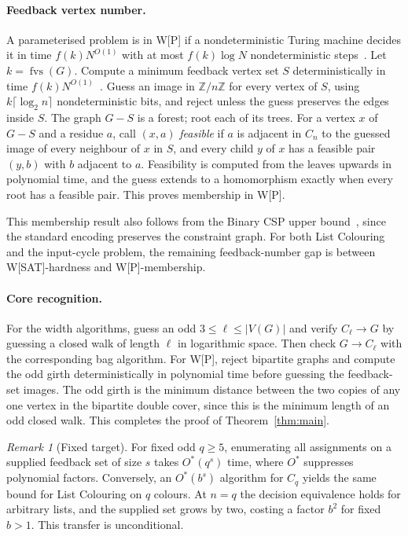 \documentclass[11pt]{article}
\theoremstyle{remark}
\newtheorem{remark}[theorem]{Remark}
\DeclareMathOperator{\fvs}{fvs}
\newcommand{\Z}{\mathbb{Z}}
\begin{document}
\paragraph{Feedback vertex number.}
A parameterised problem is in W[P] if a nondeterministic Turing machine
decides it in time $f(k)N^{O(1)}$ with at most $f(k)\log N$ nondeterministic
steps~\cite[Chapter~3]{flumgrohe2006}. Let $k=\fvs(G)$. Compute a minimum
feedback vertex set $S$ deterministically in time
$f(k)N^{O(1)}$~\cite{cygan2015}. Guess an image in $\Z/n\Z$ for every vertex
of $S$, using $k\lceil\log_2 n\rceil$ nondeterministic bits, and reject
unless the guess preserves the edges inside $S$. The graph $G-S$ is a
forest; root each of its trees. For a vertex $x$ of $G-S$ and a residue
$a$, call $(x,a)$ \emph{feasible} if $a$ is adjacent in $C_n$ to the guessed
image of every neighbour of $x$ in $S$, and every child $y$ of $x$ has a
feasible pair $(y,b)$ with $b$ adjacent to $a$. Feasibility is computed from
the leaves upwards in polynomial time, and the guess extends to a
homomorphism exactly when every root has a feasible pair. This proves
membership in W[P].

This membership result also follows from the Binary CSP upper
bound~\cite[Theorem~2]{bgp2023}, since the standard encoding preserves the
constraint graph. For both List Colouring and the input-cycle problem, the
remaining feedback-number gap is between W[SAT]-hardness and W[P]-membership.

\paragraph{Core recognition.}
For the width algorithms, guess an odd $3\leq\ell\leq|V(G)|$ and verify
$C_\ell\to G$ by guessing a closed walk of length $\ell$ in logarithmic
space. Then check $G\to C_\ell$ with the corresponding bag algorithm.
For W[P], reject bipartite graphs and compute the odd girth deterministically
in polynomial time before guessing the feedback-set images. The odd girth
is the minimum distance between the two copies of any one vertex in the
bipartite double cover, since this is the minimum length of an odd closed
walk. This completes the proof of Theorem~\ref{thm:main}.

\begin{remark}[Fixed target]\label{thm:fixed}
For fixed odd $q\geq5$, enumerating all assignments on a supplied feedback
set of size $s$ takes $O^*(q^s)$ time, where $O^*$ suppresses polynomial
factors. Conversely, an $O^*(b^s)$ algorithm for $C_q$ yields the same
bound for List Colouring on $q$ colours. At $n=q$
the decision equivalence holds for arbitrary lists, and the supplied set
grows by two, costing a factor $b^2$ for fixed $b>1$. This transfer is
unconditional.
\end{remark}
\end{document}
